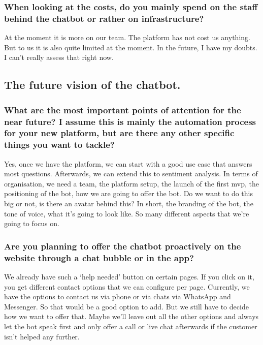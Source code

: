 \begin{appendices}
	\subsubsection{When looking at the costs, do you mainly spend on the staff behind the chatbot or rather on infrastructure?}
	At the moment it is more on our team. The platform has not cost us anything. But to us it is also quite limited at the moment. In the future, I have my doubts. I can't really assess that right now. 
	
	\subsection{The future vision of the chatbot.}
	\subsubsection{What are the most important points of attention for the near future? I assume this is mainly the automation process for your new platform, but are there any other specific things you want to tackle?}
	Yes, once we have the platform, we can start with a good use case that answers most questions. Afterwards, we can extend this to sentiment analysis. In terms of organisation, we need a team, the platform setup, the launch of the first \acrfull{mvp}, the positioning of the bot, how we are going to offer the bot. Do we want to do this big or not, is there an avatar behind this? In short, the branding of the bot, the tone of voice, what it's going to look like. So many different aspects that we're going to focus on.
	
	\subsubsection{Are you planning to offer the chatbot proactively on the website through a chat bubble or in the app?}
	We already have such a ‘help needed’ button on certain pages. If you click on it, you get different contact options that we can configure per page. Currently, we have the options to contact us via phone or via chats via WhatsApp and Messenger. So that would be a good option to add. But we still have to decide how we want to offer that. Maybe we'll leave out all the other options and always let the bot speak first and only offer a call or live chat afterwards if the customer isn't helped any further.
	

\end{appendices}
